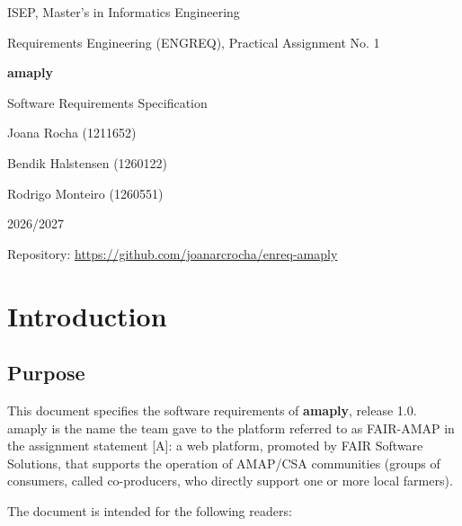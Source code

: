 \documentclass[11pt,a4paper]{article}
\begin{document}
\begin{titlepage}
\centering
\vspace*{2cm}
{\large ISEP, Master's in Informatics Engineering\par}
{\large Requirements Engineering (ENGREQ), Practical Assignment No. 1\par}
\vspace{3cm}
{\Huge\bfseries\color{hdr} amaply\par}
\vspace{0.6cm}
{\LARGE Software Requirements Specification\par}
\vspace{3cm}
{\large Joana Rocha (1211652)\par}
\vspace{0.15cm}
{\large Bendik Halstensen (1260122)\par}
\vspace{0.15cm}
{\large Rodrigo Monteiro (1260551)\par}
\vspace{0.3cm}
{\large 2026/2027\par}
\vfill
{\small Repository: \url{https://github.com/joanarcrocha/enreq-amaply}\par}
\end{titlepage}

\setcounter{page}{2}
\tableofcontents
\clearpage

\section{Introduction}


\subsection{Purpose}

This document specifies the software requirements of \textbf{amaply}, release 1.0. amaply is the name the team gave to the platform referred to as FAIR-AMAP in the assignment statement [A]: a web platform, promoted by FAIR Software Solutions, that supports the operation of AMAP/CSA communities (groups of consumers, called co-producers, who directly support one or more local farmers).

The document is intended for the following readers:
\end{document}
